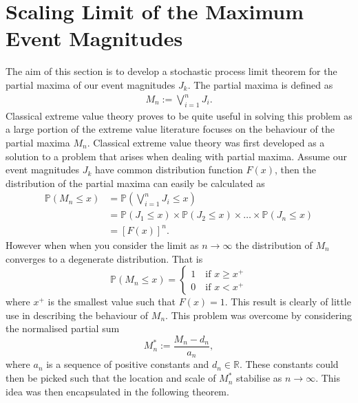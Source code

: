\documentclass[honours,12pt]{unswthesis}
\newcommand{\R}{\mathbb{R}}
\newcommand{\PP}{\mathbb{P}}
\newcommand{\1}{\mathbf 1}
\numberwithin{equation}{section}
\theoremstyle{definition}
\theoremstyle{remark}
\begin{document}
\section{Scaling Limit of the Maximum Event Magnitudes}\label{s:max}
The aim of this section is to develop a stochastic process limit theorem for the partial maxima of our event magnitudes $J_k$. The partial maxima is defined as 
\begin{align}
	M_n:=\bigvee_{i=1}^n J_i.
\end{align}
Classical extreme value theory proves to be quite useful in solving this problem as a large portion of the extreme value literature focuses on the behaviour of the partial maxima $M_n$. Classical extreme value theory was first developed as a solution to a problem that arises when dealing with partial maxima. Assume our event magnitudes $J_k$ have common distribution function $F(x)$, then the distribution of the partial maxima can easily be calculated as
\begin{align*}
\PP(M_n\leq x)&=\PP\left(\bigvee_{i=1}^n J_i\leq x\right)\\
			  &=\PP(J_1\leq x)\times\PP(J_2\leq x)\times\ldots\times\PP(J_n\leq x)\\
			  &=[F(x)]^n.
\end{align*}
However when when you consider the limit as $n\to\infty$ the distribution of $M_n$ converges to a degenerate distribution. That is 
\[
	\PP(M_n\leq x)=\begin{cases} 1 \quad \textrm{if $x\geq x^+$}\\
								  0 \quad \textrm{if $x < x^+$}					
					\end{cases}
\]
where $x^+$ is the smallest value such that $F(x)=1$. This result is clearly of little use in describing the behaviour of $M_n$. This problem was overcome by considering the normalised partial sum 
\[
	M^*_n:=\frac{M_n-d_n}{a_n},
\]
where $a_n$ is a sequence of positive constants and $d_n\in\R$. These constants could then be picked such that the location and scale of $M^*_n$ stabilise as $n\to\infty$. This idea was then encapsulated in the following theorem.\\
\end{document}
